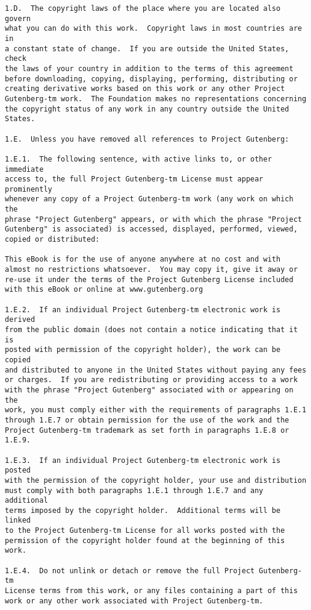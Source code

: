 \documentclass[12pt,oneside]{book}
\begin{document}
\begin{verbatim}
1.D.  The copyright laws of the place where you are located also govern
what you can do with this work.  Copyright laws in most countries are in
a constant state of change.  If you are outside the United States, check
the laws of your country in addition to the terms of this agreement
before downloading, copying, displaying, performing, distributing or
creating derivative works based on this work or any other Project
Gutenberg-tm work.  The Foundation makes no representations concerning
the copyright status of any work in any country outside the United
States.

1.E.  Unless you have removed all references to Project Gutenberg:

1.E.1.  The following sentence, with active links to, or other immediate
access to, the full Project Gutenberg-tm License must appear prominently
whenever any copy of a Project Gutenberg-tm work (any work on which the
phrase "Project Gutenberg" appears, or with which the phrase "Project
Gutenberg" is associated) is accessed, displayed, performed, viewed,
copied or distributed:

This eBook is for the use of anyone anywhere at no cost and with
almost no restrictions whatsoever.  You may copy it, give it away or
re-use it under the terms of the Project Gutenberg License included
with this eBook or online at www.gutenberg.org

1.E.2.  If an individual Project Gutenberg-tm electronic work is derived
from the public domain (does not contain a notice indicating that it is
posted with permission of the copyright holder), the work can be copied
and distributed to anyone in the United States without paying any fees
or charges.  If you are redistributing or providing access to a work
with the phrase "Project Gutenberg" associated with or appearing on the
work, you must comply either with the requirements of paragraphs 1.E.1
through 1.E.7 or obtain permission for the use of the work and the
Project Gutenberg-tm trademark as set forth in paragraphs 1.E.8 or
1.E.9.

1.E.3.  If an individual Project Gutenberg-tm electronic work is posted
with the permission of the copyright holder, your use and distribution
must comply with both paragraphs 1.E.1 through 1.E.7 and any additional
terms imposed by the copyright holder.  Additional terms will be linked
to the Project Gutenberg-tm License for all works posted with the
permission of the copyright holder found at the beginning of this work.

1.E.4.  Do not unlink or detach or remove the full Project Gutenberg-tm
License terms from this work, or any files containing a part of this
work or any other work associated with Project Gutenberg-tm.


\end{verbatim}
\end{document}
